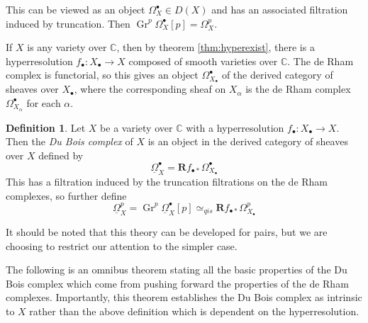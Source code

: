 \documentclass[proquest]{uwthesis}[2014/11/13]
\theoremstyle{definition}
\newtheorem{definition}[theorem]{Definition}
\DeclareMathOperator{\Gr}{Gr}
\newcommand{\CC}{\mathbb{C}}
\newcommand{\qis}{\simeq_{qis}}
\newcommand{\bR}{\textbf{R}}
\newcommand{\DB}{\underline{\Omega}}
\begin{document}
This can be viewed as an object $\Omega_X^\bullet \in D(X)$ and has an associated filtration induced by truncation.
Then $\Gr^p \Omega_X^\bullet [p] = \Omega_X^p$.

If $X$ is any variety over $\CC$, then by theorem \ref{thm:hyperexist}, there is a hyperresolution $f_\bullet : X_\bullet \rightarrow X$ composed of smooth varieties over $\CC$.
The de Rham complex is functorial, so this gives an object $\Omega_{X_\bullet}^\bullet$ of the derived category of sheaves over $X_\bullet$, where the corresponding sheaf on $X_\alpha$ is the de Rham complex $\Omega_{X_\alpha}^\bullet$ for each $\alpha$.

\begin{definition}
	Let $X$ be a variety over $\CC$ with a hyperresolution $f_\bullet : X_\bullet \rightarrow X$.
	Then the {\it Du Bois complex} of $X$ is an object in the derived category of sheaves over $X$ defined by
	\[
	\DB_X^\bullet = \bR f_{\bullet *} \Omega_{X_\bullet}^\bullet
	\]
	This has a filtration induced by the truncation filtrations on the de Rham complexes, so further define
	\[
	\DB_X^p = \Gr^p \DB_X^\bullet [p] \qis \bR f_{\bullet *} \Omega_{X_\bullet}^p
	\]
\end{definition}

It should be noted that this theory can be developed for pairs, but we are choosing to restrict our attention to the simpler case.

The following is an omnibus theorem stating all the basic properties of the Du Bois complex which come from pushing forward the properties of the de Rham complexes.
Importantly, this theorem establishes the Du Bois complex as intrinsic to $X$ rather than the above definition which is dependent on the hyperresolution.
\end{document}

